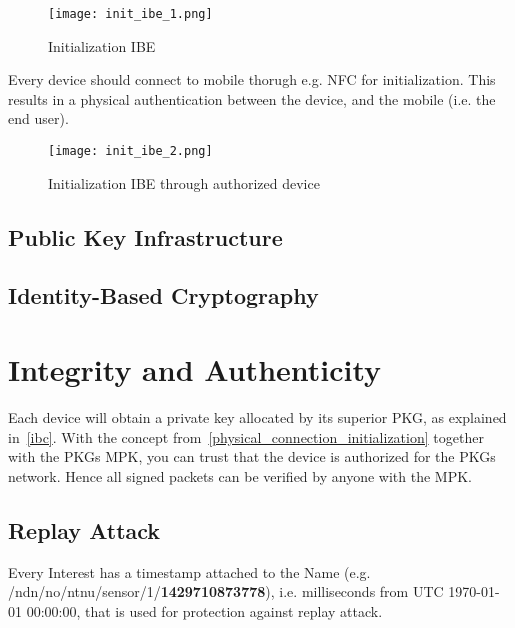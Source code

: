 \begin{figure}[ht]
  \centering
  \texttt{[image: init\_ibe\_1.png]}
  \caption{Initialization IBE}
  \label{fig:init_ibe_1}
\end{figure}

Every device should connect to mobile thorugh e.g. \gls{NFC} for initialization.
This results in a physical authentication between the device, and the mobile (i.e. the end user).

\begin{figure}[ht]
  \centering
  \texttt{[image: init\_ibe\_2.png]}
  \caption{Initialization IBE through authorized device}
  \label{fig:init_ibe_2}
\end{figure}



\subsection{Public Key Infrastructure}

\subsection{Identity-Based Cryptography}

\section{Integrity and Authenticity}

Each device will obtain a private key allocated by its superior \gls{PKG}, as explained in~\autoref{ibc}.
With the concept from~\autoref{physical_connection_initialization} together with the \gls{PKG}s \gls{MPK}, you can trust that the device is authorized for the \gls{PKG}s network. Hence all signed packets can be verified by anyone with the \gls{MPK}.

\subsection{Replay Attack}
Every Interest has a timestamp attached to the Name (e.g. /ndn/no/ntnu/sensor/1/\textbf{1429710873778}), i.e. milliseconds from UTC 1970-01-01 00:00:00, that is used for protection against replay attack. 

